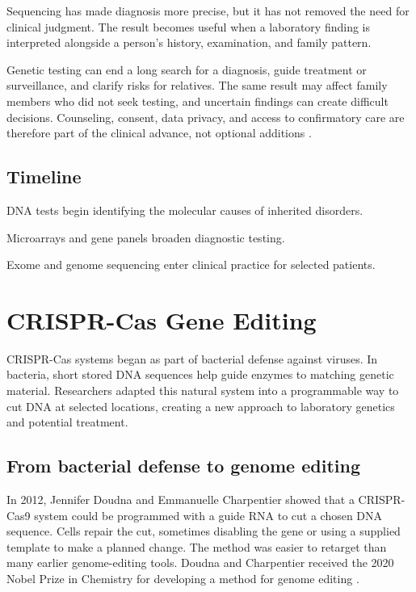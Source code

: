 \documentclass[12pt,oneside]{book}
\begin{document}
Sequencing has made diagnosis more precise, but it has not removed the need
for clinical judgment. The result becomes useful when a laboratory finding
is interpreted alongside a person's history, examination, and family
pattern.

Genetic testing can end a long search for a diagnosis, guide treatment or
surveillance, and clarify risks for relatives. The same result may affect
family members who did not seek testing, and uncertain findings can create
difficult decisions. Counseling, consent, data privacy, and access to
confirmatory care are therefore part of the clinical advance, not optional
additions \cite{nejmClinicalGenome,medlineGeneticSequencing}.

\section*{Timeline}
\begin{description}[leftmargin=2.3cm,style=nextline]
  \item[1980s onward] DNA tests begin identifying the molecular causes of inherited disorders.
  \item[2000s] Microarrays and gene panels broaden diagnostic testing.
  \item[2010s] Exome and genome sequencing enter clinical practice for selected patients.
\end{description}
\chapter[CRISPR-Cas Gene Editing]{CRISPR-Cas Gene Editing}

CRISPR-Cas systems began as part of bacterial defense against viruses. In
bacteria, short stored DNA sequences help guide enzymes to matching genetic
material. Researchers adapted this natural system into a programmable way to
cut DNA at selected locations, creating a new approach to laboratory
genetics and potential treatment.

\section{From bacterial defense to genome editing}
In 2012, Jennifer Doudna and Emmanuelle Charpentier showed that a CRISPR-Cas9
system could be programmed with a guide RNA to cut a chosen DNA sequence.
Cells repair the cut, sometimes disabling the gene or using a supplied
template to make a planned change. The method was easier to retarget than
many earlier genome-editing tools. Doudna and Charpentier received the 2020
Nobel Prize in Chemistry for developing a method for genome editing
\cite{nobelCRISPR}.
\end{document}
